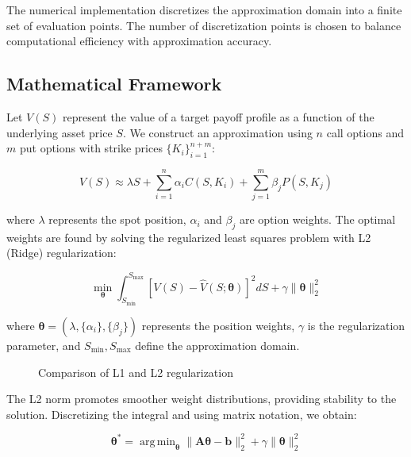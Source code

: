 \documentclass[12pt]{article}
\DeclareMathOperator*{\argmin}{arg\,min}
\begin{document}
The numerical implementation discretizes the approximation domain into a finite set of 
evaluation points. The number of discretization points is chosen to balance computational 
efficiency with approximation accuracy.

\subsection{Mathematical Framework}
Let \( V(S) \) represent the value of a target payoff profile as a function of the 
underlying asset price \( S \). We construct an approximation using \( n \) call 
options and \( m \) put options with strike prices \( \{K_i\}_{i=1}^{n+m} \):

\begin{equation}
V(S) \approx \lambda S + 
    \sum_{i=1}^{n} \alpha_i C(S, K_i) + 
    \sum_{j=1}^{m} \beta_j P(S, K_j)
\end{equation}

where \( \lambda \) represents the spot position, \( \alpha_i \) and \( \beta_j \) 
are option weights. The optimal weights are found by solving the regularized least 
squares problem with L2 (Ridge) regularization:

\begin{equation}
\min_{\boldsymbol{\theta}} 
    \int_{S_{\min}}^{S_{\max}} 
        \left[ V(S) - \hat{V}(S;\boldsymbol{\theta}) \right]^2 dS + 
    \gamma \|\boldsymbol{\theta}\|_2^2
\end{equation}

where \( \boldsymbol{\theta} = (\lambda, \{\alpha_i\}, \{\beta_j\}) \) represents
the position weights, \( \gamma \) is the regularization parameter, and 
\( S_{\min}, S_{\max} \) define the approximation domain.

\begin{figure}[htbp]
\centering

\caption{Comparison of L1 and L2 regularization}
\label{fig:regularization}
\end{figure}

The L2 norm promotes smoother weight distributions, providing stability to the solution.
Discretizing the integral and using matrix notation, we obtain:

\begin{equation}
\boldsymbol{\theta}^* = 
    \argmin_{\boldsymbol{\theta}} 
        \|\mathbf{A}\boldsymbol{\theta} - \mathbf{b}\|_2^2 + 
        \gamma \|\boldsymbol{\theta}\|_2^2
\end{equation}
\end{document}
